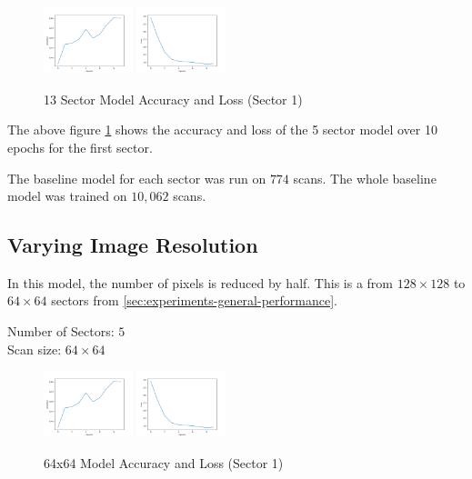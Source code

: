 \documentclass[10pt,twocolumn,letterpaper]{article}
\begin{document}
         \begin{figure}[h]
            \centering
            \includegraphics[width=0.23\textwidth]{./images/training_accuracy_13_sector_128_px.png}
            \includegraphics[width=0.23\textwidth]{./images/training_loss_13_sector_128_px.png}
            \caption{13 Sector Model Accuracy and Loss (Sector 1)}
            \label{fig:experiments-13-sector-acc-loss}
         \end{figure}

         The above figure \ref{fig:experiments-13-sector-acc-loss} shows the accuracy and loss of the 5 sector model over 10 epochs for the first sector.

         The baseline model for each sector was run on $774$ scans. The whole baseline model was trained on $10,062$ scans.
   \subsection{Varying Image Resolution} \label{sec:experiements-res}
      In this model, the number of pixels is reduced by half. This is a from $128 \times 128$ to $64 \times 64$ sectors from \ref{sec:experiments-general-performance}.
      \begin{center}
         Number of Sectors: $5$ \\
         Scan size: $64 \times 64$
      \end{center}

      \begin{figure}[h]
         \centering
         \includegraphics[width=0.23\textwidth]{./images/training_accuracy_13_sector_128_px.png}
         \includegraphics[width=0.23\textwidth]{./images/training_loss_13_sector_128_px.png}
         \caption{64x64 Model Accuracy and Loss (Sector 1)}
         \label{fig:experiments-64-px-acc-loss}
      \end{figure}
\end{document}
